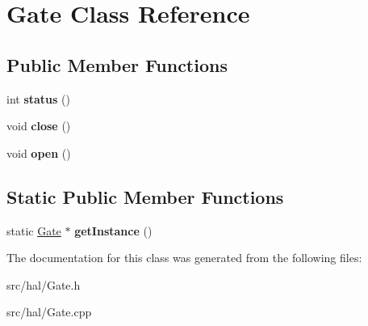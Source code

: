 \hypertarget{classGate}{\section{Gate Class Reference}
\label{classGate}
}
\subsection*{Public Member Functions}
\begin{DoxyCompactItemize}
\item 
\hypertarget{classGate_a612d63f09ecbc825508af7cf0a9e245b}{int {\bfseries status} ()}\label{classGate_a612d63f09ecbc825508af7cf0a9e245b}

\item 
\hypertarget{classGate_a3733611cc86dfe641915fcbfaf4d41c8}{void {\bfseries close} ()}\label{classGate_a3733611cc86dfe641915fcbfaf4d41c8}

\item 
\hypertarget{classGate_a6b6e01294cd8f5dbb5c93831c5cd3c3f}{void {\bfseries open} ()}\label{classGate_a6b6e01294cd8f5dbb5c93831c5cd3c3f}

\end{DoxyCompactItemize}
\subsection*{Static Public Member Functions}
\begin{DoxyCompactItemize}
\item 
\hypertarget{classGate_ac4ffd53b738c40cd854b2eb0ed7c6d23}{static \hyperlink{classGate}{Gate} $\ast$ {\bfseries get\-Instance} ()}\label{classGate_ac4ffd53b738c40cd854b2eb0ed7c6d23}

\end{DoxyCompactItemize}


The documentation for this class was generated from the following files\-:\begin{DoxyCompactItemize}
\item 
src/hal/Gate.\-h\item 
src/hal/Gate.\-cpp\end{DoxyCompactItemize}
